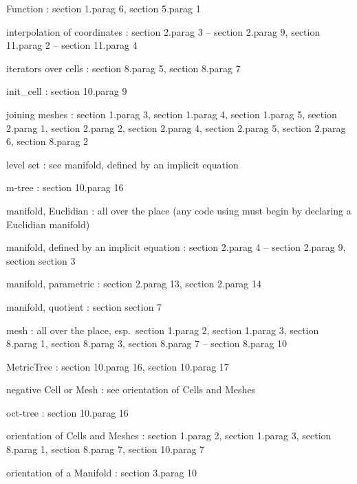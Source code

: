 {\codett Function} : \numb section 1.\numb parag 6, \numb section 5.\numb parag 1

interpolation of coordinates : \numb section 2.\numb parag 3 -- \numb section 2.\numb parag 9,
\numb section 11.\numb parag 2 -- \numb section 11.\numb parag 4

iterators over cells : \numb section 8.\numb parag 5, \numb section 8.\numb parag 7

{\codett init\_cell} : \numb section 10.\numb parag 9

{\codett join}ing meshes : \numb section 1.\numb parag 3, \numb section 1.\numb parag 4,
\numb section 1.\numb parag 5, \numb section 2.\numb parag 1, \numb section 2.\numb parag 2,
\numb section 2.\numb parag 4, \numb section 2.\numb parag 5, \numb section 2.\numb parag 6,
\numb section 8.\numb parag 2

level set : see manifold, defined by an implicit equation

m-tree : \numb section 10.\numb parag 16

manifold, Euclidian : all over the place\hfil\break
\hglue 15mm (any code using {\maniFEM} must begin by declaring a Euclidian manifold)

manifold, defined by an implicit equation : \numb section 2.\numb parag 4 --
\numb section 2.\numb parag 9, section \numb section 3

manifold, parametric : \numb section 2.\numb parag 13, \numb section 2.\numb parag 14

manifold, quotient : section \numb section 7

mesh : all over the place, esp.\ \numb section 1.\numb parag 2, \numb section 1.\numb parag 3,
\numb section 8.\numb parag 1, \numb section 8.\numb parag 3, \numb section 8.\numb parag 7
-- \numb section 8.\numb parag 10

{\codett MetricTree} : \numb section 10.\numb parag 16, \numb section 10.\numb parag 17

negative {\codett Cell} or {\codett Mesh} : see orientation of {\codett Cell}s and
{\codett Mesh}es

oct-tree : \numb section 10.\numb parag 16

orientation of {\codett Cell}s and {\codett Mesh}es : \numb section 1.\numb parag 2,
\numb section 1.\numb parag 3, \numb section 8.\numb parag 1, \numb section 8.\numb parag 7,
\numb section 10.\numb parag 7

orientation of a {\codett Manifold} : \numb section 3.\numb parag 10

